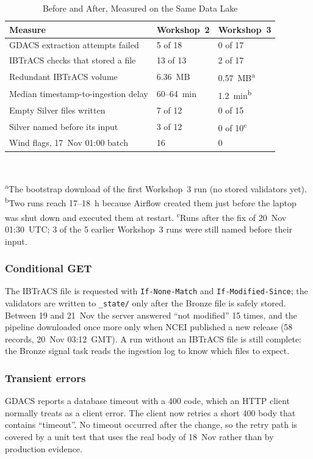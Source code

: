 \documentclass[10pt,twocolumn,letterpaper]{article}
\newcommand{\code}[1]{\texttt{\footnotesize #1}}
\begin{document}
\begin{table}[t]
\caption{Before and After, Measured on the Same Data Lake}\label{tab:beforeafter}
\centering\footnotesize
\begin{tabularx}{\columnwidth}{@{}Y L{2.0cm} L{2.0cm}@{}}
\toprule
Measure & Workshop~2 & Workshop~3\\
\midrule
GDACS extraction attempts failed & 5 of 18 & 0 of 17\\
IBTrACS checks that stored a file & 13 of 13 & 2 of 17\\
Redundant IBTrACS volume & 6.36~MB & 0.57~MB\textsuperscript{a}\\
Median timestamp-to-ingestion delay & 60--64~min & 1.2~min\textsuperscript{b}\\
Empty Silver files written & 7 of 12 & 0 of 15\\
Silver named before its input & 3 of 12 & 0 of 10\textsuperscript{c}\\
Wind flags, 17~Nov 01:00 batch & 16 & 0\\
\bottomrule
\end{tabularx}\\[2pt]
\parbox{\columnwidth}{\scriptsize \textsuperscript{a}The bootstrap download of the first Workshop~3 run (no stored validators yet). \textsuperscript{b}Two runs reach 17--18~h because Airflow created them just before the laptop was shut down and executed them at restart. \textsuperscript{c}Runs after the fix of 20~Nov 01:30~UTC; 3 of the 5 earlier Workshop~3 runs were still named before their input.}
\end{table}

\subsubsection{Conditional GET} The IBTrACS file is requested with \code{If-None-Match} and \code{If-Modified-Since}; the validators are written to \code{\_state/} only after the Bronze file is safely stored. Between 19 and 21~Nov the server answered ``not modified'' 15 times, and the pipeline downloaded once more only when NCEI published a new release (58 records, 20~Nov 03:12~GMT). A run without an IBTrACS file is still complete: the Bronze signal task reads the ingestion log to know which files to expect.

\subsubsection{Transient errors} GDACS reports a database timeout with a 400 code, which an HTTP client normally treats as a client error. The client now retries a short 400 body that contains ``timeout''. No timeout occurred after the change, so the retry path is covered by a unit test that uses the real body of 18~Nov rather than by production evidence.
\end{document}
